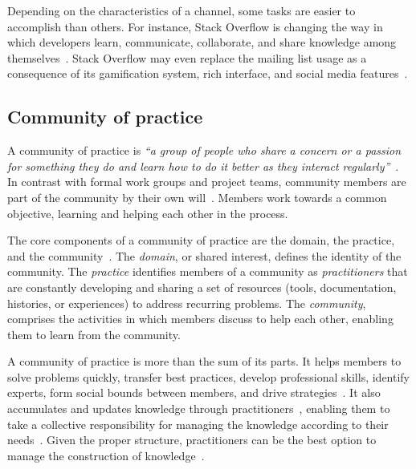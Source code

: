Depending on the characteristics of a channel, some tasks are easier to accomplish than others.
For instance, Stack Overflow is changing the way in which developers learn, communicate, collaborate, and share knowledge among themselves~\cite{Storey2014}.
Stack Overflow may even replace the mailing list usage as a consequence of its gamification system, rich interface, and social media features~\cite{Vasilescu2014b}.


\subsection{Community of practice}

    A community of practice is \textit{``a group of people who share a concern or a passion for something they do and learn how to do it better as they interact regularly''}~\cite{Wenger2000}.
    In contrast with formal work groups and project teams, community members are part of the community by their own will~\cite{Wenger2000}.
    Members work towards a common objective, learning and helping each other in the process.

    The core components of a community of practice are the domain, the practice, and the community~\cite{Wenger2011}.
    The \textit{domain}, or shared interest, defines the identity of the community.
    The \textit{practice} identifies members of a community as \textit{practitioners} that are constantly developing and sharing a set of resources (tools, documentation, histories, or experiences) to address recurring problems. 
    The \textit{community}, comprises the activities in which members discuss to help each other, enabling them to learn from the community.

    A community of practice is more than the sum of its parts.
    It helps members to solve problems quickly, transfer best practices, develop professional skills, identify experts, form social bounds between members, and drive strategies~\cite{Wenger2011, Storey2014}.
    It also accumulates and updates knowledge through practitioners~\cite{Wenger2010}, enabling them to take a collective responsibility for managing the knowledge according to their needs~\cite{Wenger2011}.
    Given the proper structure, practitioners can be the best option to manage the construction of knowledge~\cite{Wenger2011}.

